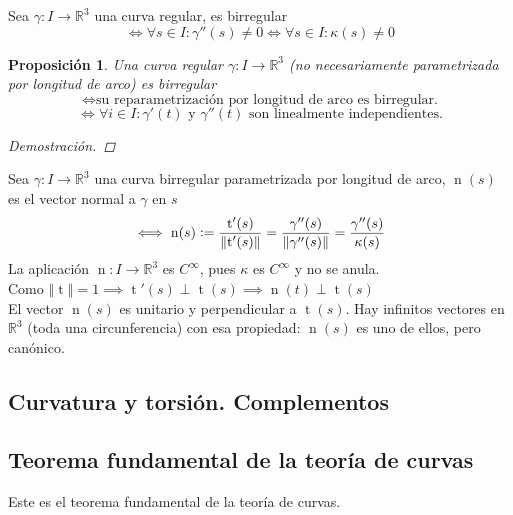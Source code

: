 \documentclass[12pt]{article}
\theoremstyle{plain}
\newtheorem{prop}{Proposición}[subsection]
\newenvironment{dem}[1][]{%
  \begin{adjustwidth}{1cm}{0cm} \begin{proof}[Demostración\ifx\relax#1\relax\else{ (#1)}\fi]
}{\end{proof}\end{adjustwidth}}
\newcommand{\R}{\mathbb{R}}
\newcommand{\norm}[1]{\left\Vert#1\right\Vert}
\newcommand{\appl}[3]{#1 \colon #2 \longrightarrow #3}
\newcommand{\ds}{\displaystyle}
\newcommand{\tex}[1]{\text{#1}}
\newcommand{\defeq}{\vcentcolon=}
\newcommand{\tngnt}{\operatorname{t}}
\newcommand{\nrml}{\operatorname{n}}
\renewcommand{\norm}[1]{\left\Vert#1\right\Vert}
\begin{document}
\begin{defn}
    Sea $\appl{\gamma}{I}{\R^3}$ una curva regular, es birregular \[\ds\iff \forall s \in I : \gamma''(s) \ne 0 \iff\forall s \in I : \kappa(s)\ne 0\]
\end{defn}
\begin{prop}
    Una curva regular $\appl{\gamma}{I}{\R^3}$ (no necesariamente parametrizada por longitud de arco) es birregular \[\iff \tex{su reparametrización por longitud de arco es birregular.}\]
    \[\iff \forall i \in I : \gamma'(t)\tex{ y }\gamma''(t) \tex{ son linealmente independientes.}\]
    \begin{dem}
        
    \end{dem}
\end{prop}
\begin{defn}
    Sea $\appl{\gamma}{I}{\R^3}$ una curva birregular parametrizada por longitud de arco, $\operatorname{n}(s)$ es el vector normal a $\gamma$ en $s$
    \[\iff\operatorname{n}(s)\defeq\frac{\tngnt'(s)}{\norm{\tngnt'(s)}}= \frac{\gamma''(s)}{\norm{\gamma''(s)}}=\frac{\gamma''(s)}{\kappa(s)}\]
    La aplicación $\appl{\operatorname{n}}{I}{\R^3}$ es $C^\infty$, pues $\kappa$ es $C^\infty$ y no se anula. \\
    Como $\norm{\tngnt}=1\implies \tngnt'(s)\perp \tngnt(s) \implies \boxed{\nrml(t) \perp \tngnt(s)}$ \\
    El vector $\nrml(s)$ es unitario y perpendicular a $\tngnt(s)$. Hay infinitos vectores en $\R^3$ (toda una circunferencia) con esa propiedad: $\nrml(s)$ es uno de ellos, pero canónico.
\end{defn}
\begin{defn}
    
\end{defn}
\begin{defn}
    
\end{defn}
\begin{defn}
    
\end{defn}
\begin{defn}[Torsión]
    
\end{defn}
\begin{defn}[Planos]
    
\end{defn}

\subsection{Curvatura y torsión. Complementos}
\subsection{Teorema fundamental de la teoría de curvas}

Este es el teorema fundamental de la teoría de curvas.
\end{document}

